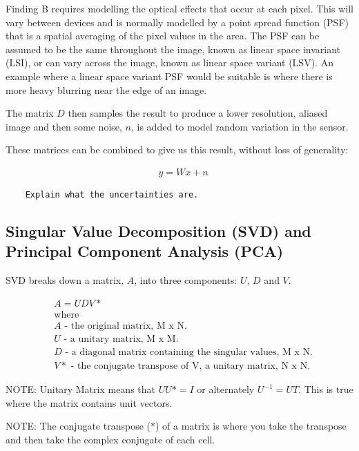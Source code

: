 \documentclass[
  oneside,
  11pt, a4paper,
  footinclude=true,
  headinclude=true,
  cleardoublepage=empty
]{scrbook}
\begin{document}
Finding B requires modelling the optical effects that occur at each pixel. This will vary between devices and is normally modelled by a point spread function (PSF) that is a spatial averaging of the pixel values in the area. The PSF can be assumed to be the same throughout the image, known as linear space invariant (LSI), or can vary across the image, known as linear space variant (LSV). An example where a linear space variant PSF would be suitable is where there is more heavy blurring near the edge of an image.

The matrix $D$ then samples the result to produce a lower resolution, aliased image and then some noise, $n$, is added to model random variation in the sensor.

These matrices can be combined to give us this result, without loss of generality:

\begin{align}
& y = Wx + n \nonumber
\end{align}

\begin{verbatim}
	Explain what the uncertainties are.
\end{verbatim}

\newpage
\subsection{Singular Value Decomposition (SVD) and Principal Component Analysis (PCA)}
SVD breaks down a matrix, $A$, into three components: $U$, $D$ and $V$.

\begin{align}
& A = UDV* \nonumber \\
& \text{where} \nonumber \\
& A \text{ - the original matrix, M x N.} \nonumber \\
& U \text{ - a unitary matrix, M x M.} \nonumber \\
& D \text{ - a diagonal matrix containing the singular values, M x N.} \nonumber \\
& V* \text{ - the conjugate transpose of V, a unitary matrix, N x N.} \nonumber
\end{align}

NOTE: Unitary Matrix means that $UU* = I$ or alternately $U^{-1} = UT$. This is true where the matrix contains unit vectors.

NOTE: The conjugate transpose ($*$) of a matrix is where you take the transpose and then take the complex conjugate of each cell.
\end{document}

